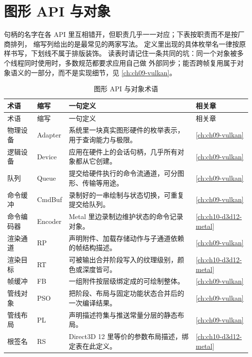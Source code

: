 \documentclass[12pt,a4paper,fontset=fandol]{ctexbook}
\begin{document}
\section{图形 API 与对象}

句柄的名字在各 API 里互相错开，但职责几乎一一对应；下表按职责而不是按厂商排列，
缩写列给出的是最常见的两家写法。
定义里出现的具体枚举名一律按原样书写，下划线不属于排版装饰。
读表时请记住一条共同的坑：同一个对象被多个线程同时使用时，多数规范都要求应用自己做
外部同步；能否跨帧复用属于对象语义的一部分，而不是实现细节，见 \ref{ch:ch09-vulkan}。

\begin{longtable}{>{\raggedright\arraybackslash}p{}
                  >{\raggedright\arraybackslash\small}p{}
                  >{\raggedright\arraybackslash\small}p{}
                  >{\raggedright\arraybackslash}p{}}
\caption{图形 API 与对象术语}\label{tab:apA-api} \\
\toprule
术语 & 缩写 & 一句定义 & 相关章 \\
\midrule
\endfirsthead
\toprule
术语 & 缩写 & 一句定义 & 相关章 \\
\midrule
\endhead
\bottomrule
\endfoot
物理设备 & Adapter & 系统里一块真实图形硬件的枚举表示，用于查询能力与极限。 & \ref{ch:ch09-vulkan} \\
逻辑设备 & Device & 应用在硬件上的会话句柄，几乎所有对象都从它创建。 & \ref{ch:ch09-vulkan} \\
队列 & Queue & 提交给硬件执行的命令流通道，可分图形、传输等用途。 & \ref{ch:ch09-vulkan} \\
命令缓冲 & CmdBuf & 录制好的一串绘制与状态切换，可重复提交给队列。 & \ref{ch:ch09-vulkan} \\
命令编码器 & Encoder & Metal 里边录制边维护状态的命令记录对象。 & \ref{ch:ch10-d3d12-metal} \\
渲染通道 & RP & 声明附件、加载存储动作与子通道依赖的帧结构描述。 & \ref{ch:ch09-vulkan} \\
渲染目标 & RT & 可被输出合并阶段写入的纹理级别，颜色或深度皆可。 & \ref{ch:ch10-d3d12-metal} \\
帧缓冲 & FB & 一组附件按层级绑定成的可绘制整体。 & \ref{ch:ch09-vulkan} \\
管线对象 & PSO & 把阶段、布局与固定功能状态合并后的一次编译结果。 & \ref{ch:ch09-vulkan} \\
管线布局 & PL & 声明描述符集与推送常量分层的静态布局。 & \ref{ch:ch09-vulkan} \\
根签名 & RS & Direct3D 12 里等价的参数布局描述，绑定表在此定义。 & \ref{ch:ch10-d3d12-metal} \\

\end{longtable}
\end{document}
